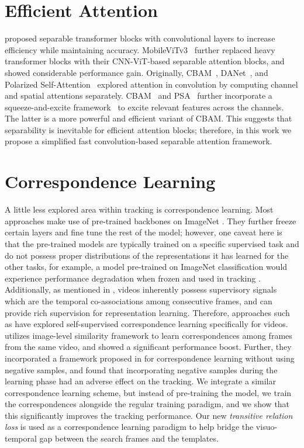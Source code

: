 \section{Efficient Attention}
\cite{mehta2022separable} proposed separable transformer blocks with convolutional layers to increase efficiency while maintaining accuracy. MobileViTv3~\cite{wadekar2022mobilevitv3} further replaced heavy transformer blocks with their CNN-ViT-based separable attention blocks, and showed considerable performance gain. Originally, CBAM~\cite{woo2018cbam}, DANet~\cite{fu2019dual}, and Polarized Self-Attention~\cite{liu2021polarized} explored attention in convolution by computing channel and spatial attentions separately. CBAM~\cite{woo2018cbam} and PSA~\cite{liu2021polarized} further incorporate a squeeze-and-excite framework~\cite{iandola2016squeezenet} to excite relevant features across the channels. The latter is a more powerful and efficient variant of CBAM.
This suggests that separability is inevitable for efficient attention blocks; therefore, in this work we propose a simplified fast convolution-based separable attention framework.

\section{Correspondence Learning}
A little less explored area within tracking is correspondence learning. Most approaches make use of pre-trained backbones on ImageNet \cite{deng2009imagenet}. They further freeze certain layers and fine tune the rest of the model; however, one caveat here is that the pre-trained models are typically trained on a specific supervised task and do not possess proper distributions of the representations it has learned for the other tasks, for example, a model pre-trained on ImageNet classification would experience performance degradation when frozen and used in tracking \cite{xu2021rethinking}.  Additionally, as mentioned in \cite{wu2021progressive}, videos inherently possess supervisory signals which are the temporal co-associations among consecutive frames, and can provide rich supervision for representation learning. Therefore, approaches such as \cite{xu2021rethinking, li2022locality, yuan2022contextualized, gordon2020watching} have explored self-supervised correspondence learning specifically for videos. \cite{xu2021rethinking} utilizes image-level similarity framework to learn correspondences among frames from the same video, and showed a significant performance boost. Further, they incorporated a framework proposed in \cite{chen2021exploring} for correspondence learning without using negative samples, and found that incorporating negative samples during the learning phase had an adverse effect on the tracking. We integrate a similar correspondence learning scheme, but instead of pre-training the model, we train the correspondences alongside the regular training paradigm, and we show that this significantly improves the tracking performance. Our new \emph{transitive relation loss} is used as a correspondence learning paradigm to help bridge the visuo-temporal gap between the search frames and the templates. 

